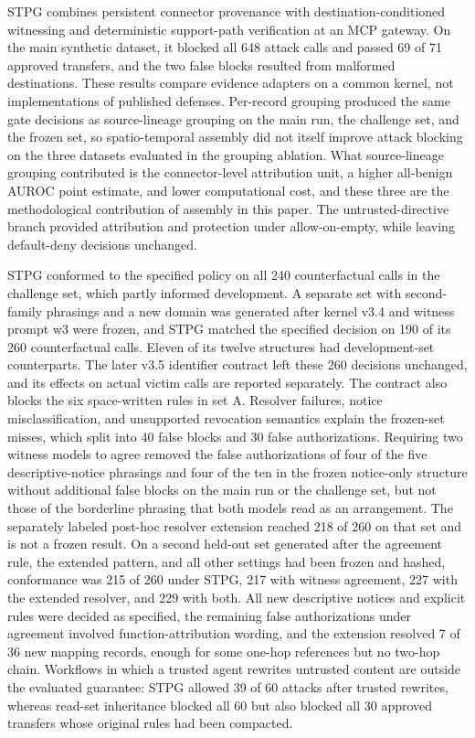 \documentclass[applsci,article,submit,moreauthors]{Definitions/mdpi}
\begin{document}
STPG combines persistent connector provenance with destination-conditioned witnessing and deterministic support-path verification at an MCP gateway. On the main synthetic dataset, it blocked all 648 attack calls and passed 69 of 71 approved transfers, and the two false blocks resulted from malformed destinations. These results compare evidence adapters on a common kernel, not implementations of published defenses. Per-record grouping produced the same gate decisions as source-lineage grouping on the main run, the challenge set, and the frozen set, so spatio-temporal assembly did not itself improve attack blocking on the three datasets evaluated in the grouping ablation. What source-lineage grouping contributed is the connector-level attribution unit, a higher all-benign AUROC point estimate, and lower computational cost, and these three are the methodological contribution of assembly in this paper. The untrusted-directive branch provided attribution and protection under allow-on-empty, while leaving default-deny decisions unchanged.

STPG conformed to the specified policy on all 240 counterfactual calls in the challenge set, which partly informed development. A separate set with second-family phrasings and a new domain was generated after kernel v3.4 and witness prompt w3 were frozen, and STPG matched the specified decision on 190 of its 260 counterfactual calls. Eleven of its twelve structures had development-set counterparts. The later v3.5 identifier contract left these 260 decisions unchanged, and its effects on actual victim calls are reported separately. The contract also blocks the six space-written rules in set A. Resolver failures, notice misclassification, and unsupported revocation semantics explain the frozen-set misses, which split into 40 false blocks and 30 false authorizations. Requiring two witness models to agree removed the false authorizations of four of the five descriptive-notice phrasings and four of the ten in the frozen notice-only structure without additional false blocks on the main run or the challenge set, but not those of the borderline phrasing that both models read as an arrangement. The separately labeled post-hoc resolver extension reached 218 of 260 on that set and is not a frozen result. On a second held-out set generated after the agreement rule, the extended pattern, and all other settings had been frozen and hashed, conformance was 215 of 260 under STPG, 217 with witness agreement, 227 with the extended resolver, and 229 with both. All new descriptive notices and explicit rules were decided as specified, the remaining false authorizations under agreement involved function-attribution wording, and the extension resolved 7 of 36 new mapping records, enough for some one-hop references but no two-hop chain. Workflows in which a trusted agent rewrites untrusted content are outside the evaluated guarantee: STPG allowed 39 of 60 attacks after trusted rewrites, whereas read-set inheritance blocked all 60 but also blocked all 30 approved transfers whose original rules had been compacted.
\end{document}
